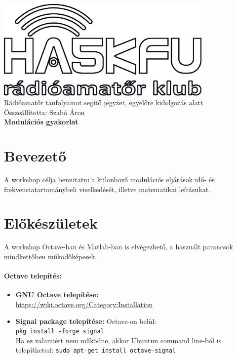 \documentclass[12pt,a4paper]{article}
\begin{document}
\begin{center}
\includegraphics[width=300pt,keepaspectratio]{figures/ha5kfu.eps}
\\[0.5cm]
Rádióamatőr tanfolyamot segítő jegyzet, egyelőre kidolgozás alatt \\
Összeállította: Szabó Áron %
\\[1cm]

{\huge \bfseries Modulációs gyakorlat \\[2cm]}



\end{center}

\renewcommand{\contentsname}{Tartalom}\tableofcontents 
\newpage

\newpage

\section{Bevezető}
A workshop célja bemutatni a különböző modulációs eljárások idő- és frekvenciatartománybeli viselkedését, illetve matematikai leírásukat. 

\section{Előkészületek}
A workshop Octave-ban és Matlab-ban is elvégezhető, a használt parancsok mindkettőben működőképesek.

\paragraph{Octave telepítés:} 
\begin{itemize}
	\item \textbf{GNU Octave telepítése:} \\\url{https://wiki.octave.org/Category:Installation}
	\item \textbf{Signal package telepítése:} Octave-on belül: 	\\
	\texttt{pkg install -forge signal}\\
	Ha ez valamiért nem működne, akkor Ubuntun command line-ból is telepítheted: \texttt{sudo apt-get install octave-signal}
\end{itemize}
\end{document}
